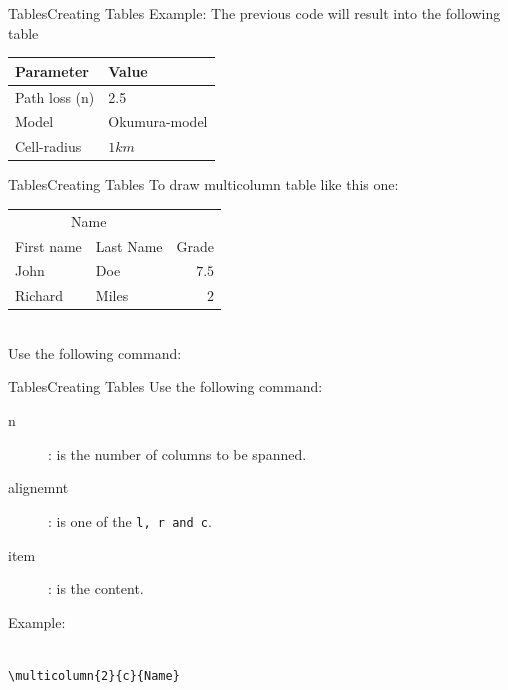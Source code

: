 \documentclass{beamer}
\begin{document}
\begin{darkframes}
\begin{frame}[fragile]{Tables}{Creating Tables}
	\alert{Example:} The previous code will result into the following table
	
	\centering
	\begin{tabular}[t]{ll}
	\toprule
	\textbf{Parameter} & \textbf{Value}\\
	\midrule
	Path loss (n) & 2.5\\
	Model & Okumura-model\\
	Cell-radius & $1km$\\
	\bottomrule
	\end{tabular}
	
\end{frame}

\begin{frame}[fragile]{Tables}{Creating Tables}
To draw multicolumn table like this one:\\
\centering

\begin{tabular}{llr}
	\toprule
	\multicolumn{2}{c}{Name} \\
	\cmidrule(lr){1-2}
	First name	& Last Name	& Grade \\
	\midrule
	John 		    & Doe	  		& $7.5$ \\
	Richard 	  & Miles		  & $2$ \\
	\bottomrule
\end{tabular}
\\
Use the following command: \texttt{}
\end{frame}

\begin{frame}[fragile]{Tables}{Creating Tables}
	Use the following command: \texttt{}
	\begin{description}
		\item [n]: is the number of columns to be spanned.
		\item [alignemnt]: is one of the \texttt{l, r and c}.
		\item [item]: is the content.
	\end{description}
\alert{Example:}
\begin{verbatim}

\multicolumn{2}{c}{Name} 

\end{verbatim}

\end{frame}


\end{darkframes}
\end{document}
